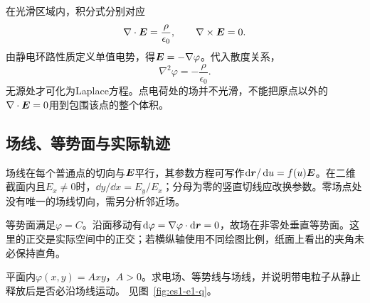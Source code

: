 在光滑区域内，积分式分别对应
\[\nabla\cdot\bm{E}=\frac\rho{\epsilon_0},\qquad
\nabla\times\bm{E}=0.\]
由静电环路性质定义单值电势，得$\bm{E}=-\nabla\varphi$。代入散度关系，
\[\boxed{\nabla^2\varphi=-\frac\rho{\epsilon_0}}.\]
无源处才可化为Laplace方程。点电荷处的场并不光滑，不能把原点以外的$\nabla\cdot\bm{E}=0$用到包围该点的整个体积。

\subsection{场线、等势面与实际轨迹}
场线在每个普通点的切向与$\bm{E}$平行，其参数方程可写作$\mathop{}\!\mathrm d\bm{r}/\mathop{}\!\mathrm d u=f(u)\bm{E}$。在二维截面内且$E_x\ne0$时，$\dd y/\dd x=E_y/E_x$；分母为零的竖直切线应改换参数。零场点处没有唯一的场线切向，需另分析邻近场。

等势面满足$\varphi=C$。沿面移动有$\mathop{}\!\mathrm d\varphi=\nabla\varphi\cdot\mathop{}\!\mathrm d\bm{r}=0$，故场在非零处垂直等势面。这里的正交是实际空间中的正交；若横纵轴使用不同绘图比例，纸面上看出的夹角未必保持直角。

\begin{example}[两种方向场的几何]\label{ex:es1-e1}
平面内$\varphi(x,y)=Axy$，$A>0$。求电场、等势线与场线，并说明带电粒子从静止释放后是否必沿场线运动。 见图~\ref{fig:es1-e1-q}。
\end{example}

